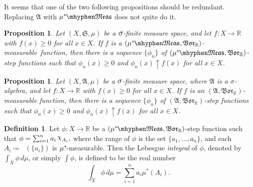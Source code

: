 \documentclass[
twoside=true,
paper=letter,
fontsize=9pt,
pagesize=auto,
leqno,
openany,
headsepline,
overfullrule,
]{scrbook}
\theoremstyle{plain}
\theoremstyle{plain}
\newtheorem{prop}[thm]{Proposition}
\theoremstyle{definition}
\newtheorem{defn}[thm]{Definition}
\theoremstyle{bfnoteitalic}
\theoremstyle{bfnoteroman}
\newcommand{\sigalg}[1]{\mathfrak{#1}}
\newcommand{\definedby}{\coloneqq}
\newcommand{\borel}{\mathfrak{Bor}}
\newcommand{\textsigma}{\hbox{\large{$\sigma$}}\kern-1pt}
\newcommand{\charfunction}[1]{\mathop{{\raisebox{2pt}{$\chi$}}_{#1}}}
\newcommand{\preimage}[1]{\mathop{#1^{\leftarrow}}}
\newcommand{\R}{\mathbb{R}}
\newcommand{\semiring}{\sigalg{S}}
\newcommand{\sigmaalgebra}{\sigalg{A}}
\newcommand{\measurable}[1]{{#1}\mhyphen\mathfrak{Meas}}
\newcommand{\kernast}{\ast\kern-1pt}
\newcommand{\mbmeasurable}{$(\measurable{\measure^\kernast},\borel_\R)$\hyp{}measurable}
\newcommand{\funcf}{f}
\newcommand{\measurespace}{X}
\newcommand{\measure}{\mu}
\newcommand{\measmu}{\mu}
\begin{document}
It seems that one of the two following propositions should be redundant.  Replacing $\sigmaalgebra$ with
$\measmu^\kernast\mhyphen\mathfrak{Meas}$
does not quite do it.


\begin{prop}\label{sigma_finite_step_functions}
Let $(\measurespace, \semiring, \measure)$ be a $\textsigma$-finite measure space, and let
$f:\measurespace\to\R$
with $f(x)\geq 0$ for all $x\in\measurespace$.
If $\funcf$ is a \mbmeasurable\ function,
then there is a sequence $\{\phi_n\}$ of
$(\measurable{\measure^\kernast},\borel_\R)$\hyp{}step functions such that $\phi_n(x)\geq 0$ and $\phi_n(x)\uparrow f(x)$ for all $x\in\measurespace$.
\end{prop}




\begin{prop}\label{sigma_finite_a_measurable}
Let $(\measurespace, \sigmaalgebra, \measure)$ be a $\textsigma$-finite measure space, where $\sigmaalgebra$ is a \textsigma\hyp{}algebra, and let
$f:\measurespace\to\R$
with $f(x)\geq 0$ for all $x\in\measurespace$.
If $\funcf$ is an $(\sigmaalgebra,\borel_\R)$\hyp{}measurable function,
then there is a sequence $\{\phi_n\}$ of
$(\sigmaalgebra,\borel_\R)$\hyp{}step functions such that $\phi_n(x)\geq 0$ and $\phi_n(x)\uparrow f(x)$ for all $x\in\measurespace$.
\end{prop}




\begin{defn}\label{integral_step_function}
Let $\phi:\measurespace\to\R$ be a $(\measurable{\measure^\kernast},\borel_\R)$-step function such that $\phi=\sum_{i=1}^{n}a_i\charfunction{A_i},$ where the range of $\phi$ is the set $\{a_1, \ldots, a_n\}$, and each
$A_i \definedby \preimage{\phi}(\{ a_i\} )$
is $\measmu^\kernast$\hyp{}measurable.
Then the Lebesgue \emph{integral}  of $\phi$, denoted by $\int_\measurespace\phi\,d\measure$, or simply $\int \phi$,  is defined to be the real number
\[
\int_\measurespace\phi\,d\measure = \sum_{i=1}^{n}a_i\measure^*(A_i).
\]
\end{defn}
\end{document}
